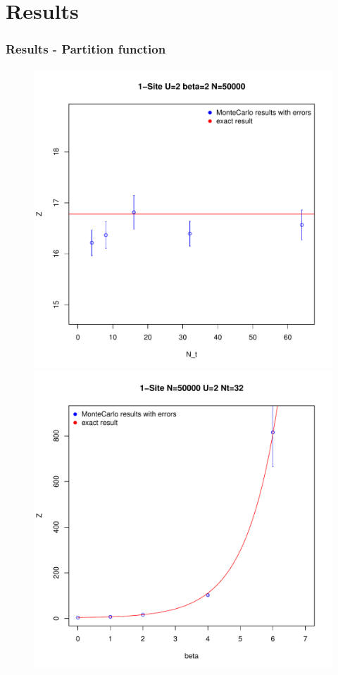 \documentclass{beamer}
\begin{document}
\section{Results}

\begin{frame}
	\frametitle{Results - Partition function}
		\begin{figure}
			\centering
			\begin{minipage}{.5\textwidth}
				\centering
				\includegraphics[width=1\linewidth]{figs/plot_Z1Nt}
			\end{minipage}%
			\begin{minipage}{.5\textwidth}
				\centering
				\includegraphics[width=1\linewidth]{figs/plot_Z1b}
			\end{minipage}
		\end{figure}
\end{frame}
\end{document}
